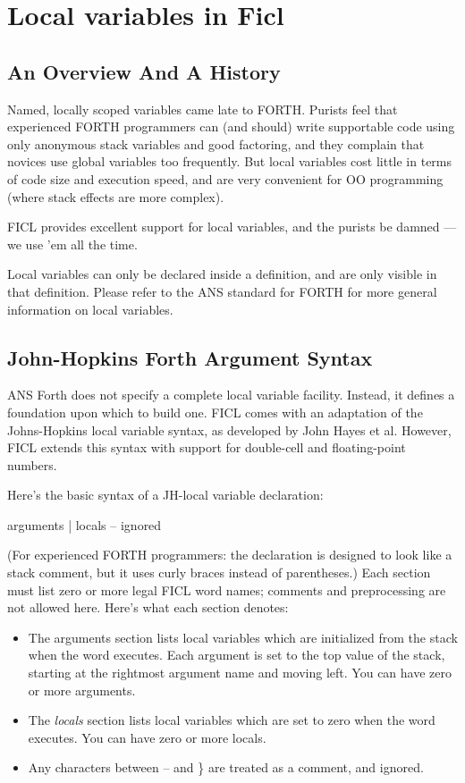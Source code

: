 \chapter{Local variables in Ficl}
\section{An Overview And A History}
Named, locally scoped variables came late to FORTH. Purists feel that
experienced FORTH programmers can (and should) write supportable code
using only anonymous stack variables and good factoring, and they
complain that novices use global variables too frequently. But local
variables cost little in terms of code size and execution speed, and
are very convenient for OO programming (where stack effects are more
complex).

FICL provides excellent support for local variables, and the purists be
damned — we use 'em all the time.

Local variables can only be declared inside a definition, and are only
visible in that definition. Please refer to the ANS standard for FORTH
for more general information on local variables.


\section{John-Hopkins Forth Argument Syntax}
ANS Forth does not specify a complete local variable facility. Instead,
it defines a foundation upon which to build one. FICL comes with an
adaptation of the Johns-Hopkins local variable syntax, as developed by
John Hayes et al. However, FICL extends this syntax with support for
double-cell and floating-point numbers.

Here's the basic syntax of a JH-local variable declaration:

{ arguments | locals -- ignored }

(For experienced FORTH programmers: the declaration is designed to look
like a stack comment, but it uses curly braces instead of parentheses.)
Each section must list zero or more legal FICL word names; comments and
preprocessing are not allowed here. Here's what each section denotes:
\begin{itemize}[noitemsep]
	\item The arguments section lists local variables which are
	initialized from the stack when the word executes. Each argument
	is set to the top value of the stack, starting at the rightmost
	argument name and moving left. You can have zero or more
	arguments.

	\item The \textit{locals} section lists local variables which
	are set to zero when the word executes. You can have zero or
	more locals.

	\item Any characters between -- and \} are treated as a
	comment, and ignored.
\end{itemize}

